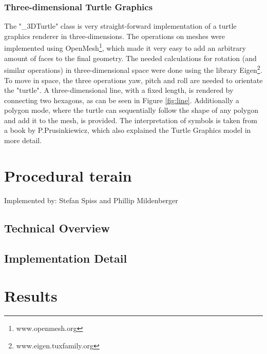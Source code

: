 \documentclass[11pt,a4paper]{article}
\begin{document}
\subsubsection{Three-dimensional Turtle Graphics}
The "\_3DTurtle" class is very straight-forward implementation of a turtle graphics renderer in three-dimensions. The operations on meshes were implemented using OpenMesh\footnote{www.openmesh.org}, which made it very easy to add an arbitrary amount of faces to the final geometry. The needed calculations for rotation (and similar operations) in three-dimensional space were done using the library Eigen\footnote{www.eigen.tuxfamily.org}. To move in space, the three operations yaw, pitch and roll are needed to orientate the "turtle". A three-dimensional line, with a fixed length, is rendered by connecting two hexagons, as can be seen in Figure \ref{fig:line}. Additionally a polygon mode, where the turtle can sequentially follow the shape of any polygon and add it to the mesh, is provided. The interpretation of symbols is taken from a book by P.Prusinkiewicz, which also explained the Turtle Graphics model in more detail.

\section{Procedural terain}
Implemented by: Stefan Spiss and Phillip Mildenberger

\subsection{Technical Overview}


\subsection{Implementation Detail}


\section{Results}


\newpage


\end{document}
